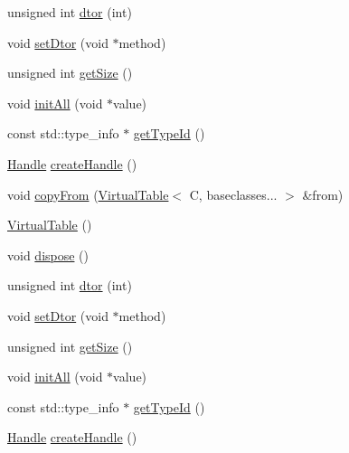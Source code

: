\begin{DoxyCompactItemize}
\item 
unsigned int \mbox{\hyperlink{structfakeit_1_1VirtualTable_a7be0619d713b6ae2cac5722895176a14}{dtor}} (int)
\item 
void \mbox{\hyperlink{structfakeit_1_1VirtualTable_adee13076280ff9bd4c06b5f1e62d6708}{set\+Dtor}} (void $\ast$method)
\item 
unsigned int \mbox{\hyperlink{structfakeit_1_1VirtualTable_a014d48c976f89207564bf8d68b64a039}{get\+Size}} ()
\item 
void \mbox{\hyperlink{structfakeit_1_1VirtualTable_a261b66b33067b4425791762cb3786f20}{init\+All}} (void $\ast$value)
\item 
const std\+::type\+\_\+info $\ast$ \mbox{\hyperlink{structfakeit_1_1VirtualTable_a5ed35b122d5d06afced80ab93062bfa3}{get\+Type\+Id}} ()
\item 
\mbox{\hyperlink{classfakeit_1_1VirtualTable_1_1Handle}{Handle}} \mbox{\hyperlink{structfakeit_1_1VirtualTable_a616ff0e7567c8c5f368faff1dca949df}{create\+Handle}} ()
\item 
void \mbox{\hyperlink{structfakeit_1_1VirtualTable_a79d7c3b29e6da1ba1974c8c9d69fd7bd}{copy\+From}} (\mbox{\hyperlink{structfakeit_1_1VirtualTable}{Virtual\+Table}}$<$ C, baseclasses... $>$ \&from)
\item 
\mbox{\hyperlink{structfakeit_1_1VirtualTable_ae64da18818c25b107d8f9f2c615c4c37}{Virtual\+Table}} ()
\item 
void \mbox{\hyperlink{structfakeit_1_1VirtualTable_a58c2bfa93deb68aba5eced688c168e66}{dispose}} ()
\item 
unsigned int \mbox{\hyperlink{structfakeit_1_1VirtualTable_a7be0619d713b6ae2cac5722895176a14}{dtor}} (int)
\item 
void \mbox{\hyperlink{structfakeit_1_1VirtualTable_adee13076280ff9bd4c06b5f1e62d6708}{set\+Dtor}} (void $\ast$method)
\item 
unsigned int \mbox{\hyperlink{structfakeit_1_1VirtualTable_a014d48c976f89207564bf8d68b64a039}{get\+Size}} ()
\item 
void \mbox{\hyperlink{structfakeit_1_1VirtualTable_a261b66b33067b4425791762cb3786f20}{init\+All}} (void $\ast$value)
\item 
const std\+::type\+\_\+info $\ast$ \mbox{\hyperlink{structfakeit_1_1VirtualTable_a5ed35b122d5d06afced80ab93062bfa3}{get\+Type\+Id}} ()
\item 
\mbox{\hyperlink{classfakeit_1_1VirtualTable_1_1Handle}{Handle}} \mbox{\hyperlink{structfakeit_1_1VirtualTable_a616ff0e7567c8c5f368faff1dca949df}{create\+Handle}} ()
\end{DoxyCompactItemize}
